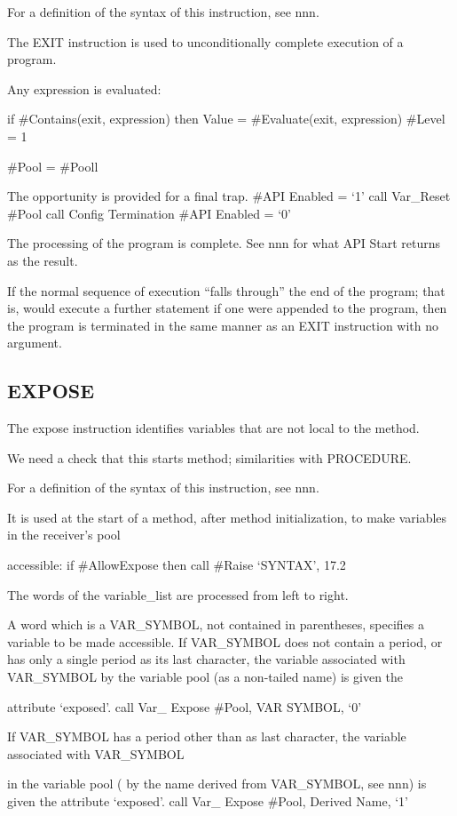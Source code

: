 For a definition of the syntax of this instruction, see nnn.

The EXIT instruction is used to unconditionally complete execution of a
program.

Any expression is evaluated:

if \#Contains(exit, expression) then Value = \#Evaluate(exit,
expression) \#Level = 1

\#Pool = \#Pooll

The opportunity is provided for a final trap. \#API Enabled = `1' call
Var\_Reset \#Pool call Config Termination \#API Enabled = `0'

The processing of the program is complete. See nnn for what API Start
returns as the result.

If the normal sequence of execution ``falls through'' the end of the
program; that is, would execute a further statement if one were appended
to the program, then the program is terminated in the same manner as an
EXIT instruction with no argument.

\subsection{EXPOSE}\label{expose}

The expose instruction identifies variables that are not local to the
method.

We need a check that this starts method; similarities with PROCEDURE.

For a definition of the syntax of this instruction, see nnn.

It is used at the start of a method, after method initialization, to
make variables in the receiver's pool

accessible: if \#AllowExpose then call \#Raise `SYNTAX', 17.2

The words of the variable\_list are processed from left to right.

A word which is a VAR\_SYMBOL, not contained in parentheses, specifies a
variable to be made accessible. If VAR\_SYMBOL does not contain a
period, or has only a single period as its last character, the variable
associated with VAR\_SYMBOL by the variable pool (as a non-tailed name)
is given the

attribute `exposed'. call Var\_ Expose \#Pool, VAR SYMBOL, `0'

If VAR\_SYMBOL has a period other than as last character, the variable
associated with VAR\_SYMBOL

in the variable pool ( by the name derived from VAR\_SYMBOL, see nnn) is
given the attribute `exposed'. call Var\_ Expose \#Pool, Derived Name,
`1'

